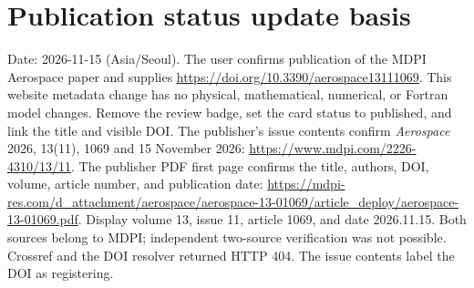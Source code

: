 \documentclass{article}
\begin{document}
\section*{Publication status update basis}
Date: 2026-11-15 (Asia/Seoul).
The user confirms publication of the MDPI Aerospace paper and supplies
\url{https://doi.org/10.3390/aerospace13111069}.
This website metadata change has no physical, mathematical, numerical,
or Fortran model changes.
Remove the review badge, set the card status to published, and link the
title and visible DOI. The publisher's issue contents confirm
\textit{Aerospace} 2026, 13(11), 1069 and 15 November 2026:
\url{https://www.mdpi.com/2226-4310/13/11}.
The publisher PDF first page confirms the title, authors, DOI,
volume, article number, and publication date:
\url{https://mdpi-res.com/d_attachment/aerospace/aerospace-13-01069/article_deploy/aerospace-13-01069.pdf}.
Display volume 13, issue 11, article 1069, and date 2026.11.15.
Both sources belong to MDPI; independent two-source verification was
not possible. Crossref and the DOI resolver returned HTTP 404.
The issue contents label the DOI as registering.
\end{document}
